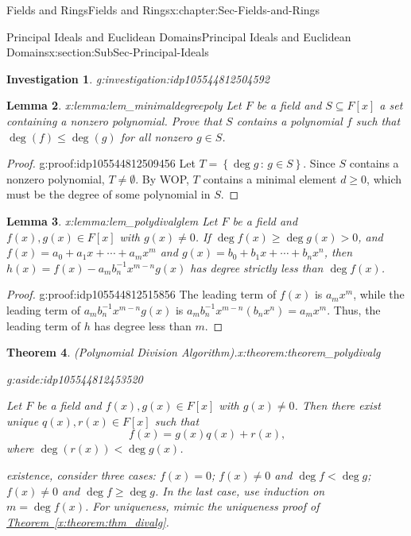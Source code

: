 \documentclass[oneside,10pt,]{book}
\newcommand{\xreffont}{\relax}
\numberwithin{equation}{section}
\renewcommand{\le}{\leqslant}
\renewcommand{\ge}{\geqslant}
\newcommand{\setof}[2]{{\left\{#1\,\colon\,#2\right\}}}
\newtheorem{theorem}{Theorem}[section]
\newtheorem{lemma}[theorem]{Lemma}
\newtheorem{investigation}[theorem]{Investigation}
\newcommand{\lt}{<}
\begin{document}
\begin{chapterptx}{Fields and Rings}{}{Fields and Rings}{}{}{x:chapter:Sec-Fields-and-Rings}
\begin{sectionptx}{Principal Ideals and Euclidean Domains}{}{Principal Ideals and Euclidean Domains}{}{}{x:section:SubSec-Principal-Ideals}
\begin{investigation}{}{g:investigation:idp105544812504592}
\end{investigation}%
\begin{lemma}{}{}{x:lemma:lem_minimaldegreepoly}%
Let \(F\) be a field and \(S\subseteq F[x]\) a set containing a nonzero polynomial. Prove that \(S\) contains a polynomial \(f\) such that \(\deg(f) \le \deg(g)\) for all nonzero \(g\in S\).%
\end{lemma}
\begin{proof}{}{g:proof:idp105544812509456}
Let \(T = \setof{\deg g}{g\in S}\). Since \(S\) contains a nonzero polynomial, \(T\ne \emptyset\). By WOP, \(T\) contains a minimal element \(d \ge 0\), which must be the degree of some polynomial in \(S\).%
\end{proof}
\begin{lemma}{}{}{x:lemma:lem_polydivalglem}%
Let \(F\) be a field and \(f(x),g(x)\in F[x]\) with \(g(x)\ne 0\). If \(\deg f(x) \ge \deg g(x) > 0\), and \(f(x) = a_0 + a_1 x + \cdots + a_m x^m\) and \(g(x) = b_0 + b_1 x + \cdots + b_n x^n\), then \(h(x) = f(x) - a_m b_n^{-1} x^{m-n} g(x)\) has degree strictly less than \(\deg f(x)\).%
\end{lemma}
\begin{proof}{}{g:proof:idp105544812515856}
The leading term of \(f(x)\) is \(a_m x^m\), while the leading term of \(a_m b_n^{-1} x^{m-n} g(x)\) is \(a_m b_n^{-1} x^{m-n} (b_n x^n) = a_m x^m\). Thus, the leading term of \(h\) has degree less than \(m\).%
\end{proof}
\begin{theorem}{(Polynomial Division Algorithm).}{}{x:theorem:theorem_polydivalg}%
\begin{aside}{}{g:aside:idp105544812453520}%
\end{aside}
Let \(F\) be a field and \(f(x),g(x)\in F[x]\) with \(g(x)\ne 0\). Then there exist unique \(q(x),
r(x) \in F[x]\) such that%
\begin{equation*}
f(x) = g(x) q(x) + r(x)\text{,}
\end{equation*}
where \(\deg(r(x)) \lt  \deg g(x)\).%
\par\smallskip%
\noindentFor existence, consider three cases: \(f(x) = 0\); \(f(x) \ne 0\) and \(\deg f \lt \deg g\); \(f(x) \ne 0\) and \(\deg f \ge \deg g\). In the last case, use induction on \(m = \deg f(x)\). For uniqueness, mimic the uniqueness proof of \hyperref[x:theorem:thm_divalg]{Theorem~{\xreffont\ref{x:theorem:thm_divalg}}}.%
\end{theorem}
%

\end{sectionptx}
\end{chapterptx}
\end{document}
